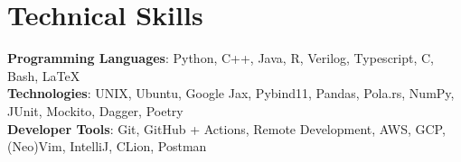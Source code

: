 \documentclass[letterpaper,11pt]{article}
\begin{document}
\section{Technical Skills}
 \begin{itemize}[leftmargin=0.15in, label={}]
    \small{\item{
     \textbf{Programming Languages}{: Python, C++, Java, R, Verilog, Typescript, C, Bash, \LaTeX} \\
     \textbf{Technologies}{: UNIX, Ubuntu, Google Jax, Pybind11, Pandas, Pola.rs, NumPy, JUnit, Mockito, Dagger, Poetry } \\
    \textbf{Developer Tools}{: Git, GitHub + Actions, Remote Development, AWS, GCP, (Neo)Vim, IntelliJ, CLion, Postman} \\
    }}
 \end{itemize}
\end{document}
